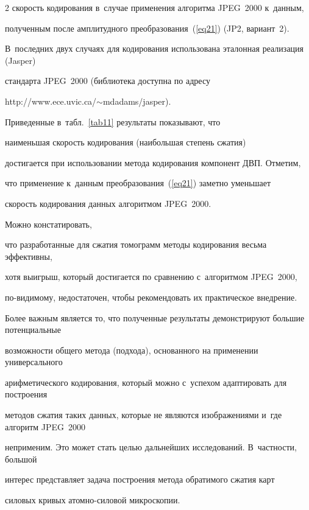 \begin{multicols}{2}
скорость кодирования в~случае применения алгоритма JPEG~2000 к~данным, 

полученным после амплитудного преобразования~(\ref{eq21}) (JP2, вариант~2). 

В~последних двух случаях для кодирования использована эталонная реализация (Jasper) 

стандарта JPEG~2000 (библиотека доступна по адресу 

{\sf http://www.ece.uvic.ca/$\sim$mdadams/jasper}).





Приведенные в~табл.~\ref{tab11} результаты показывают, что 

наименьшая скорость кодирования (наибольшая степень сжатия) 

достигается при использовании метода кодирования компонент ДВП. Отметим, 

что применение к~данным преобразования~(\ref{eq21}) заметно уменьшает 

скорость кодирования данных алгоритмом JPEG~2000. 



Можно констатировать, 

что разработанные для сжатия томограмм методы кодирования весьма эффективны, 

хотя выигрыш, который достигается по сравнению с~алгоритмом JPEG~2000, 

по-ви\-ди\-мо\-му, недостаточен, чтобы рекомендовать их практическое внедрение. 

Более важным является то, что полученные результаты демонстрируют большие потенциальные 

возможности общего метода (подхода), основанного на применении универсального 

арифметического кодирования, который можно с~успехом адаптировать для построения 

методов сжатия таких данных, которые не являются изображениями и~где алгоритм JPEG~2000 

неприменим. Это может стать целью дальнейших исследований. В~част\-ности, большой 

интерес представляет задача построения метода обратимого сжатия карт 

силовых кривых атом\-но-си\-ло\-вой микроскопии.









\end{multicols}
